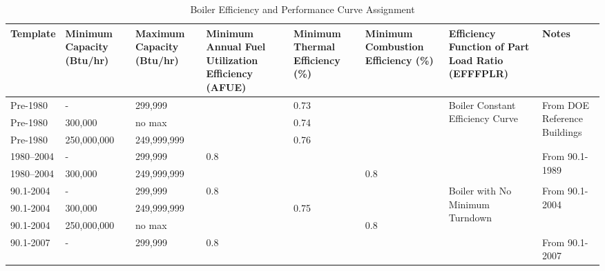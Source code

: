\begin{table}[htbp]
\centering
\scriptsize
\caption{Boiler Efficiency and Performance Curve Assignment}
\label{tab:boiler_eff_table}
\begin{tabular}{|p{0.5in}|p{0.5in}|p{1.7cm}|p{0.5in}|p{0.5in}|p{0.5in}|p{1in}|p{0.5in}|}
\hline
\textbf{Template} &
  \textbf{Minimum   Capacity (Btu/hr)} &
  \textbf{Maximum   Capacity (Btu/hr)} &
  \textbf{Minimum   Annual Fuel Utilization Efficiency (AFUE)} &
  \textbf{Minimum   Thermal Efficiency (\%)} &
  \textbf{Minimum   Combustion Efficiency (\%)} &
  \textbf{Efficiency Function of Part Load Ratio (EFFFPLR)} &
  \textbf{Notes} \\ \hline
Pre-1980 &
  - &
  299,999 &
   &
  0.73 &
   &
  \multirow{5}{*}{\parbox{0.5in}{Boiler Constant Efficiency Curve}} &
  \multirow{3}{*}{\parbox{0.5in}{From DOE Reference Buildings}} \\ \cline{1-6}
Pre-1980  & 300,000     & no max &      & 0.74 &      &                                                     &                                   \\ \cline{1-6}
Pre-1980  & 250,000,000 & 249,999,999 &      & 0.76 &      &                                                     &                                   \\ \cline{1-6} \cline{8-8} 
1980--2004 & -           & 299,999       & 0.8  &      &      &                                                     & \multirow{2}{*}{\parbox{0.5in}{From   90.1-1989}} \\ \cline{1-6}
1980--2004 & 300,000     & 249,999,999   &      &      & 0.8  &                                                     &                                   \\ \hline
90.1-2004           & -           & 299,999       & 0.8  &      &      & \multirow{11}{*}{\parbox{1in}{Boiler with No Minimum Turndown}} & \multirow{3}{*}{\parbox{0.5in}{From   90.1-2004}} \\ \cline{1-6}
90.1-2004           & 300,000     & 249,999,999   &      & 0.75 &      &                                                     &                                   \\ \cline{1-6}
90.1-2004           & 250,000,000 & no max &      &      & 0.8  &                                                     &                                   \\ \cline{1-6} \cline{8-8} 
90.1-2007           & -           & 299,999       & 0.8  &      &      &                                                     & \multirow{3}{*}{\parbox{0.5in}{From   90.1-2007}} \\ \cline{1-6}

\end{tabular}
\end{table}
